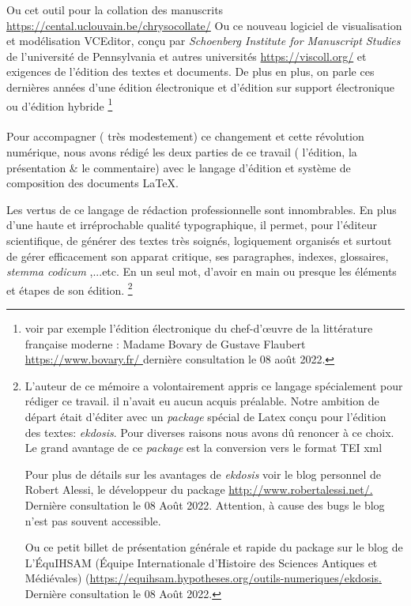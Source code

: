 \documentclass[a4paper,12pt]{report}
\begin{document}
\begin{itemize}
{Ou cet outil pour la collation des manuscrits \url{https://cental.uclouvain.be/chrysocollate/} Ou ce nouveau logiciel de visualisation et modélisation VCEditor, conçu par  \textit{Schoenberg Institute for Manuscript Studies} de l'université de  Pennsylvania et autres universités  \url{https://viscoll.org/} } et exigences de l'édition des textes et documents. De plus en plus, on parle ces dernières années d'une édition électronique et d'édition sur support électronique ou d'édition hybride \footnote{ voir par exemple l'édition électronique du chef-d'œuvre de la littérature française moderne : Madame Bovary de Gustave Flaubert \url{ https://www.bovary.fr/ } dernière consultation le 08 août 2022.}  
\paragraph{}

Pour accompagner ( très modestement) ce changement et cette révolution numérique, nous avons  rédigé les  deux parties de ce  travail ( l'édition, la présentation \& le commentaire)  avec  le langage d'édition et système de composition des documents \LaTeX   .

Les vertus de ce langage  de rédaction  professionnelle  sont innombrables. En plus  d'une haute et irréprochable qualité typographique, il permet, pour l'éditeur scientifique, de générer des textes très soignés, logiquement organisés et surtout de gérer efficacement son apparat critique, ses paragraphes, indexes, glossaires, \textit{stemma codicum} ,...etc. En un seul mot, d'avoir en main ou presque les éléments et étapes de son édition. \footnote { L'auteur de ce mémoire  a volontairement appris  ce langage spécialement pour rédiger ce travail. il n'avait eu aucun acquis préalable. Notre ambition de départ était d'éditer avec un  \textit{package} spécial de Latex conçu pour l'édition des textes:\textit{ ekdosis}. Pour diverses raisons nous avons dû renoncer à ce choix. Le grand avantage de ce \textit{package }est la  conversion vers le format TEI xml

Pour plus de détails sur les avantages de \textit{ ekdosis}  voir le blog personnel de Robert Alessi, le développeur du package \url{http://www.robertalessi.net/.}  Dernière consultation le 08 Août 2022. Attention, à cause des bugs le blog n'est pas souvent accessible. 

Ou  ce petit billet de présentation générale et rapide du package sur le blog de L’ÉquIHSAM (Équipe Internationale d’Histoire des Sciences Antiques et Médiévales) (\url{https://equihsam.hypotheses.org/outils-numeriques/ekdosis.} 
Dernière consultation le 08 Août 2022.

}
\end{itemize}
\end{document}
